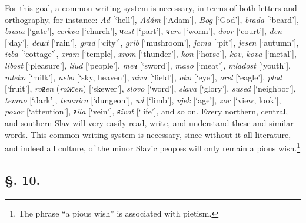 For this goal, a common writing system is necessary, in terms of both letters and orthography, for instance: \textit{Ad} [‘hell’], \textit{Adám} [‘Adam’], \textit{Bog} [‘God’], \textit{brada} [‘beard’], \textit{brana} [‘gate’], \textit{cerkva} [‘church’], \textit{чast} [‘part’], \textit{чerv} [‘worm’], \textit{dvor} \linebreak{} [‘court’], \textit{den} [‘day’], \textit{deшt} [‘rain’], \textit{grad} [‘city’], \textit{grib} [‘mushroom’], \textit{jama} [‘pit’], \textit{jesen} [‘autumn’], \textit{izba} [‘cottage’], \textit{xram} [‘temple], \textit{xrom} [‘thunder’], \textit{kon} [‘horse’], \textit{kov}, \textit{kova} [‘metal’], \textit{libost} [‘pleasure’], \textit{liud} [‘people’], \textit{meч} [‘sword’], \textit{maso} \linebreak{}[‘meat’], \textit{mladost} [‘youth’], \textit{mleko} [‘milk’], \textit{nebo} [‘sky, heaven’], \textit{niva} [‘field’], \textit{oko} [‘eye’], \textit{orel} [‘eagle’], \textit{plod} [‘fruit’], \textit{roƶen} (\textit{roжen}) [‘skewer’], \textit{slovo} [‘word’], \textit{slava} [‘glory’], \textit{sused} [‘neighbor’], \textit{temno} [‘dark’], \textit{temnica} [‘dungeon’], \textit{ud} [‘limb’], \textit{vjek} [‘age’], \textit{zor} [‘view, look’], \textit{pozor} [‘attention’], \textit{ƶila} [‘vein’], \textit{ƶivot} [‘life’], and so on. Every northern, central, and southern Slav will very easily read, write, and understand these and similar words. This common writing system is necessary, since without it all literature, and indeed all culture, of the minor Slavic peoples will only remain a pious wish.\footnote{The phrase “a pious wish” is associated with pietism.}

\subsection*{\hspace*{\fill}§. 10.\hspace*{\fill}}

